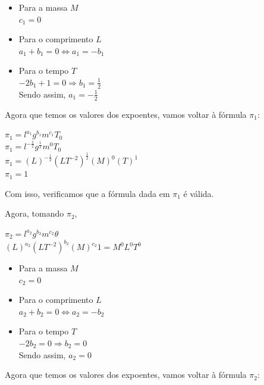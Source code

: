 \begin{itemize}
    \item Para a massa $M$ \\
    $c_{1}=0$
    \item Para o comprimento $L$ \\
    $a_{1}+b_{1}=0 \Leftrightarrow a_{1}=-b_{1}$
    \item Para o tempo $T$ \\
    $-2b_{1}+1=0 \Rightarrow b_{1}=\frac{1}{2}$ \\
Sendo assim, $a_{1}=-\frac{1}{2}$
\end{itemize}

Agora que temos os valores dos expoentes, vamos voltar à fórmula $\pi_1$:

\begin{center}
     $\pi_{1} = l^{a_1} g^{b_1} m^{c_1} T_{0}$ \\
      \vspace{0,2cm}
      $\pi_{1} = l^{-\frac{1}{2}} g^{\frac{1}{2}} m^{0} T_{0}$ \\
       \vspace{0,2cm}
     $\pi_1=(L)^{-\frac{1}{2}} (LT^{-2})^{\frac{1}{2}} (M)^{0} (T)^1$ \\
     \vspace{0,2cm}
     $\pi_1=1$
\end{center}

Com isso, verificamos que a fórmula dada em $\pi_1$ é válida. 

Agora, tomando $\pi_{2}$, 
\begin{center}
    $\pi_{2} = l^{a_2} g^{b_2} m^{c_2}\theta$ \\
     \vspace{0,2cm}
     $(L)^{a_2} (LT^{-2})^{b_2} (M)^{c_2}1 = M^0 L^0 T^0$
\end{center}

\begin{itemize}
    \item Para a massa $M$ \\
    $c_{2}=0$
    \item Para o comprimento $L$ \\
    $a_{2}+b_{2}=0 \Leftrightarrow a_{2}=-b_{2}$
    \item Para o tempo $T$ \\
    $-2b_{2}=0 \Rightarrow b_{2}=0$ \\
Sendo assim, $a_{2}=0$
\end{itemize}

Agora que temos os valores dos expoentes, vamos voltar à fórmula $\pi_2$:

